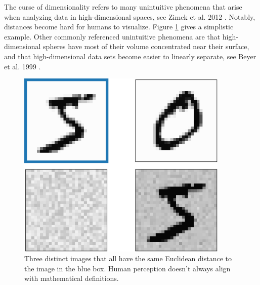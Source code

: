 \documentclass[12pt,oneside]{CUNY_PhD}
\begin{document}
The curse of dimensionality refers to many unintuitive phenomena that arise when analyzing data in high-dimensional spaces, see Zimek et al. 2012 \cite{zimek2012survey}. Notably, distances become hard for humans to visualize. Figure \ref{fig:mot-dist} gives a simplistic example. Other commonly referenced unintuitive phenomena are that high-dimensional spheres have most of their volume concentrated near their surface, and that high-dimensional data sets become easier to linearly separate, see Beyer et al. 1999 \cite{beyer1999nearest}.
\begin{figure}[!t]
    \centering
    \includegraphics[width=0.9\textwidth]{images/Motivation/motivation-distances.png}
    \caption{Three distinct images that all have the same Euclidean distance to the image in the blue box. Human perception doesn't always align with mathematical definitions.}
    \label{fig:mot-dist}
\end{figure}
\end{document}
